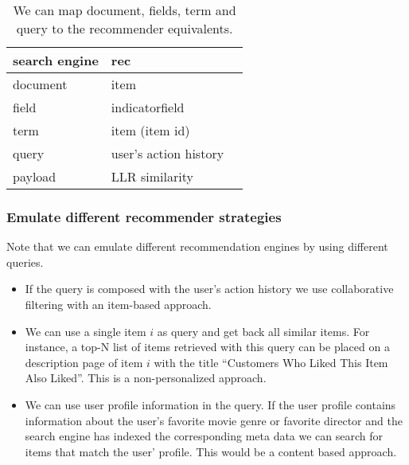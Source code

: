 \begin{table}
\begin{center}
\begin{tabular}{lll}
 search engine & \gls{rec}\\ \hline
  document & item\\ 
 field & indicatorfield \\
 term & item (item id)    \\
 query & user's action history \\
payload & LLR similarity \\
\end{tabular}
\end{center}
\caption{We can map document, fields, term and query to the recommender equivalents.}
\label{tbl:comparison}
\end{table}

\subsubsection{Emulate different recommender strategies}

Note that we can emulate different recommendation engines by using different queries.
\begin{itemize}
\item If the query is composed with the user's action history we use collaborative filtering with an item-based approach.
\item We can use a single item $i$ as query and get back all similar items. For instance, a top-N list of items retrieved with this query can be placed on a description page of item $i$ with the title ``Customers Who Liked This Item Also Liked''. This is a non-personalized approach.
\item We can use user profile information in the query. If the user profile contains information about the user's favorite movie genre or favorite director and the search engine has indexed the corresponding meta data we can search for items that match the user' profile. This would be a content based approach.
\end{itemize}
